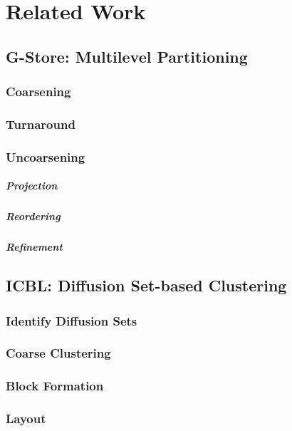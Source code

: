 \chapter{Related Work}\label{\positionnumber}
\section{G-Store: Multilevel Partitioning}\label{\positionnumber}
        \subsection{Coarsening}\label{\positionnumber}
        \subsection{Turnaround}\label{\positionnumber}
        \subsection{Uncoarsening}\label{\positionnumber}
            \paragraph{Projection}
            \paragraph{Reordering}
            \paragraph{Refinement}

\section{ICBL: Diffusion Set-based Clustering}\label{\positionnumber}
    \subsection{Identify Diffusion Sets}\label{\positionnumber}
    \subsection{Coarse Clustering}\label{\positionnumber}
    \subsection{Block Formation}\label{\positionnumber}
    \subsection{Layout}\label{\positionnumber}
